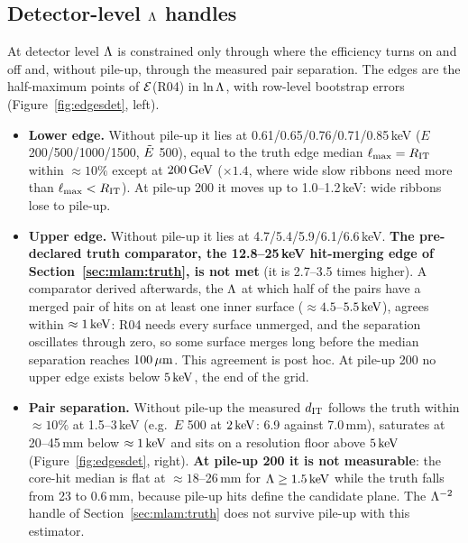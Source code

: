 \subsection{Detector-level $\Lambda$ handles}\label{sec:mlam:det}
At detector level $\Lambda$ is constrained only through where the efficiency turns on and off and, without pile-up, through
the measured pair separation. The edges are the half-maximum points of $\mathcal{E}$(R04) in $\ln\Lambda$, with row-level bootstrap
errors (Figure~\ref{fig:edgesdet}, left).
\begin{itemize}
\item \textbf{Lower edge.} Without pile-up it lies at 0.61/0.65/0.76/0.71/0.85\,keV ($E$ 200/500/1000/1500, $\tilde{E}$ 500),
  equal to the truth edge median $\ell_{\max}=R_{\rm IT}$ within $\approx10\%$ except at $200\,\mathrm{GeV}$ ($\times1.4$, where wide slow ribbons
  need more than $\ell_{\max}<R_{\rm IT}$). At pile-up 200 it moves up to 1.0--1.2\,keV: wide ribbons lose to pile-up.
\item \textbf{Upper edge.} Without pile-up it lies at 4.7/5.4/5.9/6.1/6.6\,keV. \textbf{The pre-declared truth comparator,
  the 12.8--25\,keV hit-merging edge of Section~\ref{sec:mlam:truth}, is not met} (it is 2.7--3.5 times higher). A comparator
  derived afterwards, the $\Lambda$ at which half of the pairs have a merged pair of hits on at least one inner surface
  ($\approx4.5$--$5.5\,\mathrm{keV}$), agrees within $\approx1\,\mathrm{keV}$: R04 needs every surface unmerged, and the separation oscillates
  through zero, so some surface merges long before the median separation reaches $100\,\mu\mathrm{m}$. This agreement is post hoc. At
  pile-up 200 no upper edge exists below $5\,\mathrm{keV}$, the end of the grid.
\item \textbf{Pair separation.} Without pile-up the measured $d_{\rm IT}$ follows the truth within $\approx10\%$ at 1.5--3\,keV
  (e.g.\ $E$ 500 at $2\,\mathrm{keV}$: 6.9 against 7.0\,mm), saturates at 20--45\,mm below $\approx1\,\mathrm{keV}$ and sits on a resolution floor
  above $5\,\mathrm{keV}$ (Figure~\ref{fig:edgesdet}, right). \textbf{At pile-up 200 it is not measurable}: the core-hit median is flat at
  $\approx18$--26\,mm for $\Lambda\ge1.5\,\mathrm{keV}$ while the truth falls from 23 to 0.6\,mm, because pile-up hits define the candidate
  plane. The $\Lambda^{-2}$ handle of Section~\ref{sec:mlam:truth} does not survive pile-up with this estimator.
\end{itemize}

